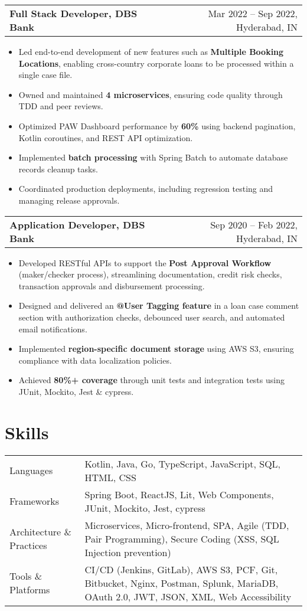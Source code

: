 \documentclass[a4paper,12pt]{article}
\makeatletter
\newenvironment{joblong}[2]
    {
    \begin{tabularx}{\linewidth}{@{}l X r@{}}
    \textbf{#1} & &  #2 \\
    \end{tabularx}
    \begin{minipage}[t]{\linewidth}
    \begin{itemize}[nosep,after=\strut, leftmargin=1em, itemsep=3pt,label=--]
    }
    {
    \end{itemize}
    \end{minipage}    
    }
\makeatother
\begin{document}
\begin{joblong}{Full Stack Developer, DBS Bank}{Mar 2022 -- Sep 2022, Hyderabad, IN}
\item Led end-to-end development of new features such as \textbf{Multiple Booking Locations}, enabling cross-country corporate loans to be processed within a single case file.
\item Owned and maintained \textbf{4 microservices}, ensuring code quality through TDD and peer reviews.
\item Optimized PAW Dashboard performance by \textbf{60\%} using backend pagination, Kotlin coroutines, and REST API optimization.
\item Implemented \textbf{batch processing} with Spring Batch to automate database records cleanup tasks.
\item Coordinated production deployments, including regression testing and managing release approvals.
\end{joblong}

\begin{joblong}{Application Developer, DBS Bank}{Sep 2020 -- Feb 2022, Hyderabad, IN}
\item Developed RESTful APIs to support the \textbf{Post Approval Workflow} (maker/checker process), streamlining documentation, credit risk checks, transaction approvals and disbursement processing.
\item Designed and delivered an \textbf{@User Tagging feature} in a loan case comment section with authorization checks, debounced user search, and automated email notifications.
\item Implemented \textbf{region-specific document storage} using AWS S3, ensuring compliance with data localization policies.
\item Achieved \textbf{80\%+ coverage} through unit tests and integration tests using JUnit, Mockito, Jest \& cypress.
\end{joblong}
\section{Skills}
\begin{tabularx}{\linewidth}{@{}l X@{}}
Languages & Kotlin, Java, Go, TypeScript, JavaScript, SQL, HTML, CSS \\
Frameworks & Spring Boot, ReactJS, Lit, Web Components, JUnit, Mockito, Jest, cypress \\
Architecture \& Practices & Microservices, Micro-frontend, SPA, Agile (TDD, Pair Programming), Secure Coding (XSS, SQL Injection prevention) \\
Tools \& Platforms & CI/CD (Jenkins, GitLab), AWS S3, PCF, Git, Bitbucket, Nginx, Postman, Splunk, MariaDB, OAuth 2.0, JWT, JSON, XML, Web Accessibility \\
\end{tabularx}
\end{document}
